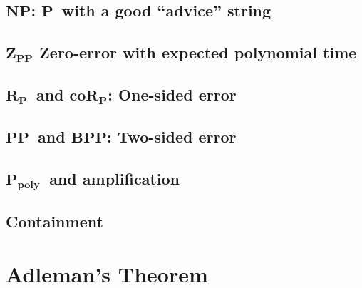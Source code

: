 \documentclass[11pt]{article}
\newcommand{\Pt}{\ensuremath{\mathbf{P}}}
\newcommand{\NP}{\ensuremath{\mathbf{NP}}}
\newcommand{\PP}{\ensuremath{\mathbf{PP}}}
\newcommand{\BPP}{\ensuremath{\mathbf{BPP}}}
\newcommand{\ZPP}{\ensuremath{\mathbf{Z_{PP}}}}
\newcommand{\RP}{\ensuremath{\mathbf{R_{P}}}}
\newcommand{\coRP}{\ensuremath{\mathbf{coR_{P}}}}
\newcommand{\Ppoly}{\ensuremath{\mathbf{P_{poly}}}}
\begin{document}
\subsection{\NP: \Pt\ with a good ``advice'' string}

\subsection{\ZPP\: Zero-error with expected polynomial time}

\subsection{\RP\ and \coRP: One-sided error }

\subsection{\PP\ and \BPP: Two-sided error }

\subsection{\Ppoly\ and amplification}

\subsection{Containment}

\section{Adleman's Theorem}



\begin{thebibliography}{42}


\end{thebibliography}
\end{document}

